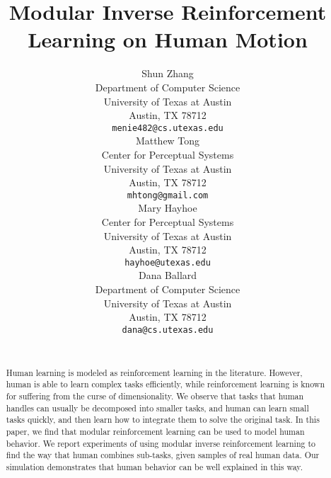 \documentclass[11pt]{article} %
\title{Modular Inverse Reinforcement Learning on Human Motion}
\author{
Shun Zhang\\
Department of Computer Science\\
University of Texas at Austin\\
Austin, TX 78712 \\
\texttt{menie482@cs.utexas.edu} \\
\And
Matthew Tong \\
Center for Perceptual Systems\\
University of Texas at Austin\\
Austin, TX 78712 \\
\texttt{mhtong@gmail.com} \\
\AND
Mary Hayhoe \\
Center for Perceptual Systems\\
University of Texas at Austin\\
Austin, TX 78712 \\
\texttt{hayhoe@utexas.edu} \\
\And
Dana Ballard \\
Department of Computer Science\\
University of Texas at Austin\\
Austin, TX 78712 \\
\texttt{dana@cs.utexas.edu} \\
\\
}
\begin{document}
\maketitle

\begin{abstract}
Human learning is modeled as reinforcement learning in the literature. However,
human is able to learn complex tasks efficiently, while reinforcement
learning is known for suffering from the curse of dimensionality. We observe that
tasks that human handles can usually be decomposed into smaller tasks, and human can
learn small tasks quickly, and then learn how to integrate them to solve the
original task. In this paper, we find that modular reinforcement learning can be
used to model human behavior. We report experiments of using modular inverse
reinforcement learning to find the way that human combines sub-tasks, given
samples of real human data. Our simulation demonstrates that human behavior can
be well explained in this way.
\end{abstract}


\startmain %





\end{document}
